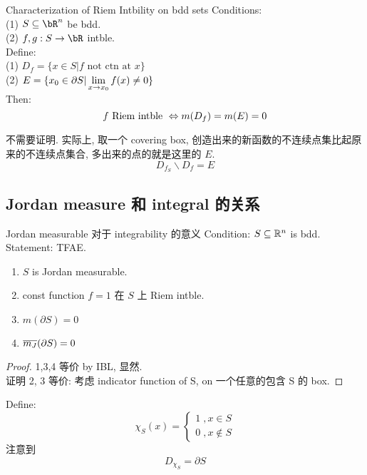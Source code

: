 \documentclass[lang=cn,11pt]{elegantbook}
\begin{document}
\begin{theorem}{Characterization of Riem Intbility on bdd sets}\label{Characterization of Riem Intbility on bdd sets}
    Conditions:\\
    (1) $S \sub \bR^n$ be bdd.\\
    (2) $f,g: S\rar \bR$ intble.\\
    Define:\\
    (1) $D_f = \{x \in S | f \text{ not ctn at } x\}$\\
    (2) $E = \{ x_0 \in \partial S  | \displaystyle \lim_{x \rightarrow x_0} f(x) \not = 0 \}$
    \\Then:
    $$
    f \text{ Riem intble } \displaystyle\Leftrightarrow m(D_f) = m(E) = 0
    $$
\end{theorem}
\begin{remark}
    不需要证明. 实际上, 取一个 covering box, 创造出来的新函数的不连续点集比起原来的不连续点集合, 多出来的点的就是这里的 $E$.
    $$
    D_{f_S} \backslash D_f = E
    $$
\end{remark}



\subsection{Jordan measure 和 integral 的关系}
\begin{theorem}{Jordan measurable 对于 integrability 的意义} \label{equivalent conditions for Jordan-mesurability}
    Condition: $S \subseteq \mathbb{R}^n $ is bdd.\\
    Statement: TFAE.
    \begin{enumerate}
        \item $S$ is Jordan measurable.
        \item const function $f = 1$ 在 $S$ 上 Riem intble.
        \item  $m(\partial S) = 0$
        \item  $\overline{m_J}(\partial S) = 0 $
    \end{enumerate}
\end{theorem}
\begin{proof}
    1,3,4 等价 by IBL, 显然.\\
    证明 2, 3 等价: 考虑 indicator function of S, on 一个任意的包含 S 的 box.
\end{proof}

\begin{remark}
Define: 
$$
\chi_S (x) = \begin{cases}
    1 \; , x \in S \\
    0 \; , x \not\in S
\end{cases}
$$
注意到
$$
D_{\chi_S} = \partial S
$$
\end{remark}
\end{document}
